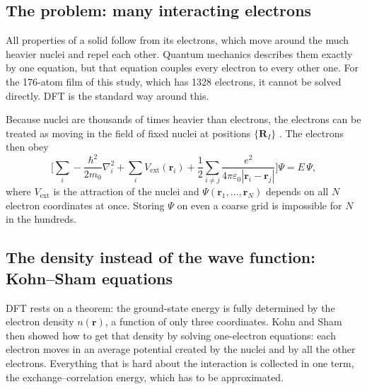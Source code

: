 \subsection{The problem: many interacting electrons}
\label{sec:dft-problem}

\begin{dftplain}
All properties of a solid follow from its electrons, which move around the much heavier nuclei and repel each other.
Quantum mechanics describes them exactly by one equation, but that equation couples every electron to every other one.
For the 176-atom film of this study, which has 1328 electrons, it cannot be solved directly. DFT is the standard way
around this.
\end{dftplain}

Because nuclei are thousands of times heavier than electrons, the electrons can be treated as moving in the field of
fixed nuclei at positions $\{\mathbf{R}_I\}$ \citep{Born1927}. The electrons then obey
\begin{equation}
\Big[\sum_i -\frac{\hbar^2}{2m_0}\nabla_i^2 + \sum_i V_{\mathrm{ext}}(\mathbf{r}_i)
+ \frac{1}{2}\sum_{i\neq j}\frac{e^2}{4\pi\varepsilon_0|\mathbf{r}_i-\mathbf{r}_j|}\Big]\Psi = E\,\Psi ,
\label{eq:dft-manybody}
\end{equation}
where $V_{\mathrm{ext}}$ is the attraction of the nuclei and $\Psi(\mathbf{r}_1,\ldots,\mathbf{r}_N)$ depends on all $N$
electron coordinates at once. Storing $\Psi$ on even a coarse grid is impossible for $N$ in the hundreds.

\subsection{The density instead of the wave function: Kohn--Sham equations}
\label{sec:dft-ks}

\begin{dftplain}
DFT rests on a theorem: the ground-state energy is fully determined by the electron density $n(\mathbf{r})$, a function
of only three coordinates. Kohn and Sham then showed how to get that density by solving one-electron equations: each
electron moves in an average potential created by the nuclei and by all the other electrons. Everything that is hard
about the interaction is collected in one term, the exchange--correlation energy, which has to be approximated.
\end{dftplain}

